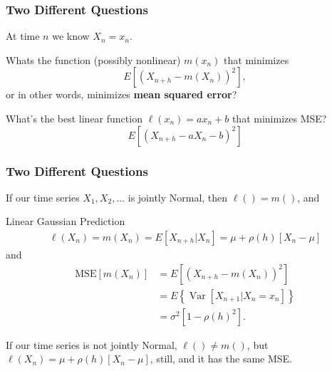 \documentclass{beamer}
\begin{document}


\begin{frame}
\frametitle{Two Different Questions}

At time $n$ we know $X_n = x_n$. 
\newline

Whats the function (possibly nonlinear) $m(x_n)$ that minimizes
\[
E[(X_{n+h} - m(X_n))^2],
\]
or in other words, minimizes {\bf mean squared error}?
\newline

What's the best linear function $\ell(x_n) = ax_n + b$ that minimizes MSE?
\[
E[(X_{n+h} - aX_n - b)^2]
\]
\end{frame}


\begin{frame}
\frametitle{Two Different Questions}

If our time series $X_1, X_2, \ldots $ is jointly Normal, then $\ell() = m()$, and 
\begin{block}{Linear Gaussian Prediction}
\begin{eqnarray}
\ell(X_n) = m(X_n) = E[X_{n+h}|X_n] = \mu +   \rho(h) [X_n - \mu ]
\end{eqnarray}
and
\begin{align*}
\text{MSE}[m(X_n)] &= E[(X_{n+h} - m(X_n))^2] \\
&= E\left\{\operatorname{Var}[X_{n+1}|X_n=x_n] \right\}\\
&= \sigma^2[1 - \rho(h)^2]. 
\end{align*}
\end{block}

If our time series is not jointly Normal, $\ell() \neq m()$, but $\ell(X_n) = \mu +   \rho(h) [X_n - \mu ]$, still, and it has the same MSE.
\newline

\end{frame}
\end{document}
